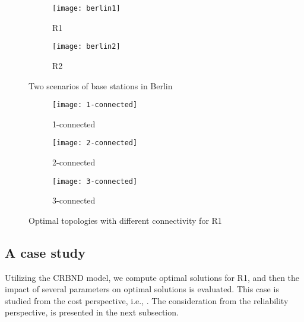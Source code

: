 \documentclass[onecolumn,11pt,draftclsnofoot]{IEEEtran}
\begin{document}
\begin{figure}
        \centering
        \begin{subfigure}[b]{0.25\textwidth}
                \centering
                \texttt{[image: berlin1]}
                \caption{R1}
                \label{fig:berlin1}
        \end{subfigure}
        \begin{subfigure}[b]{0.25\textwidth}
                \centering
                \texttt{[image: berlin2]}
                \caption{R2}
                \label{fig:berlin2}
        \end{subfigure}
        \caption{Two scenarios of base stations in Berlin}\label{fig:scenarios}
\end{figure}
\begin{figure*}[!hbtp]
        \centering
        \begin{subfigure}[b]{0.3\textwidth}
                \centering
                \texttt{[image: 1-connected]}
                \caption{1-connected}
                \label{fig:1-connected}
        \end{subfigure}
        \begin{subfigure}[b]{0.3\textwidth}
                \centering
                \texttt{[image: 2-connected]}
                \caption{2-connected}
                \label{fig:2-connected}
        \end{subfigure}
        \begin{subfigure}[b]{0.3\textwidth}
                \centering
                \texttt{[image: 3-connected]}
                \caption{3-connected}
                \label{fig:3-connected}
        \end{subfigure}
        \caption{Optimal topologies with different connectivity for R1}\label{fig:connectivity}
\end{figure*}


\subsection{A case study}
Utilizing the CRBND model, we compute optimal solutions for R1, and then the impact of several parameters on optimal solutions is evaluated.
This case is studied from the cost perspective, i.e., . The consideration from the reliability perspective, is presented in the next subsection.
\end{document}
